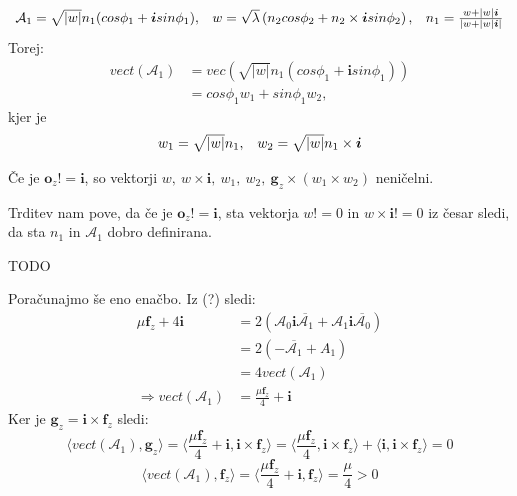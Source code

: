 \documentclass[mat1]{fmfdelo}
\newcommand{\ii}{\boldsymbol i}
\newcommand{\oo}{\boldsymbol o}
\newcommand{\A}{\mathcal A}
\newcommand{\ff}{\boldsymbol f}
\newcommand{\g}{\boldsymbol g}
\begin{document}
\begin{equation}
	\begin{array}{c c c}
	\A_1 = \sqrt{|w|} n_1(cos\phi_1 + \ii sin\phi_1), & w = \sqrt{\lambda} \left(n_2 cos\phi_2 + n_2 \times \ii sin\phi_2\right), & n_1 = \frac{w + |w| \ii}{|w + |w|\ii|}
	\end{array}
\end{equation}
Torej:
\begin{equation}
\begin{split}
	vect(\A_1) &= vec\left( \sqrt{|w|} n_1(cos\phi_1 + \ii sin\phi_1) \right) \\
	&=cos\phi_1 w_1 + sin\phi_1 w_2,
\end{split}
\end{equation}
kjer je
\begin{equation}
	\begin{array}{c c}
	w_1 = \sqrt{|w|} n_1, & w_2 = \sqrt{|w|} n_1 \times \ii
	\end{array}
\end{equation}
\begin{trditev}
	Če je $\oo_z != \ii$, so vektorji $w,~ w\times \ii,~ w_1,~w_2,~\g_z\times(w_1\times w_2)$ neničelni.
\end{trditev}
\begin{opomba}
	Trditev nam pove, da če je $\oo_z != \ii$, sta vektorja $w!=0$ in $w\times \ii != 0$ iz česar sledi, da sta $n_1$ in $\A_1$ dobro definirana.
\end{opomba}
\begin{dokaz}
	TODO
\end{dokaz}
Poračunajmo še eno enačbo. Iz (?) sledi:
\begin{equation}
	\begin{split}
	\mu \ff_z + 4 \ii &= 2(\A_0 \ii \overline{\A_1} + \A_1 \ii \overline{\A_0})\\
	&= 2(-\overline{\A_1} + A_1) \\
	&= 4vect(\A_1) \\
	\Longrightarrow vect(\A_1) &= \frac{\mu \ff_z}{4} + \ii
	\end{split}
\end{equation}
Ker je $\g_z = \ii \times \ff_z$ sledi:
\begin{equation}
	\langle vect(\A_1), \g_z\rangle = \langle \frac{\mu \ff_z}{4} + \ii ,\ii \times \ff_z \rangle = 
	\langle \frac{\mu \ff_z}{4} ,\ii \times \ff_z \rangle + 
	\langle \ii ,\ii \times \ff_z \rangle = 0
\end{equation}
\begin{equation}
	\langle vect(\A_1), \ff_z \rangle = \langle \frac{\mu \ff_z}{4} + \ii ,\ff_z \rangle = \frac{\mu}{4} > 0
\end{equation}
\end{document}
